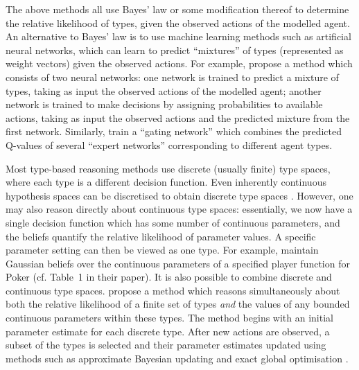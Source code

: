 \documentclass[final,1p,times,authoryear]{elsarticle}
\begin{document}
The above methods all use Bayes' law or some modification thereof to determine the relative likelihood of types, given the observed actions of the modelled agent. An alternative to Bayes' law is to use machine learning methods such as artificial neural networks, which can learn to predict ``mixtures'' of types (represented as weight vectors) given the observed actions. For example, \citet{lcm2007} propose a method which consists of two neural networks: one network is trained to predict a mixture of types, taking as input the observed actions of the modelled agent; another network is trained to make decisions by assigning probabilities to available actions, taking as input the observed actions and the predicted mixture from the first network. Similarly, \citet{hbkd2016} train a ``gating network'' which combines the predicted Q-values of several ``expert networks'' corresponding to different agent types.

Most type-based reasoning methods use discrete (usually finite) type spaces, where each type is a different decision function. Even inherently continuous hypothesis spaces can be discretised to obtain discrete type spaces \citep[e.g.][]{ht2008}. However, one may also reason directly about continuous type spaces: essentially, we now have a single decision function which has some number of continuous parameters, and the beliefs quantify the relative likelihood of parameter values. A specific parameter setting can then be viewed as one type. For example, \citet{sbl2005} maintain Gaussian beliefs over the continuous parameters of a specified player function for Poker (cf. Table~1 in their paper). It is also possible to combine discrete and continuous type spaces. \citet{as2017} propose a method which reasons simultaneously about both the relative likelihood of a finite set of types \emph{and} the values of any bounded continuous parameters within these types. The method begins with an initial parameter estimate for each discrete type. After new actions are observed, a subset of the types is selected and their parameter estimates updated using methods such as approximate Bayesian updating and exact global optimisation \citep{hpt2000}.
\end{document}
